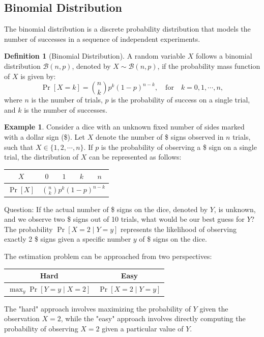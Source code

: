 \documentclass[12pt,openany]{book}
\theoremstyle{definition}
\newtheorem{definition}{Definition}[chapter]
\newtheorem{example}{Example}[chapter]
\begin{document}
	\subsection{Binomial Distribution}
	The binomial distribution is a discrete probability distribution that models the number of successes in a sequence of independent experiments.
	
	\begin{definition}[Binomial Distribution]
		A random variable $X$ follows a binomial distribution $\mathcal{B}(n, p)$, denoted by $X \sim \mathcal{B}(n, p)$, if the probability mass function of $X$ is given by:
		\[
		\Pr[X=k]=\binom{n}{k}p^k(1-p)^{n-k},\quad\text{for}\quad k=0,1,\cdots,n,
		\]
		where $n$ is the number of trials, $p$ is the probability of success on a single trial, and $k$ is the number of successes.
	\end{definition}
	
	\begin{example}
		Consider a dice with an unknown fixed number of sides marked with a dollar sign (\$). Let $X$ denote the number of \$ signs observed in $n$ trials, such that $X \in \{1, 2, \cdots, n\}$. If $p$ is the probability of observing a \$ sign on a single trial, the distribution of $X$ can be represented as follows:
		
		\begin{center}
			\begin{tabular}{c|cccc}
				$X$ & $0$ & $1$ & $k$ & $n$ \\
				\hline
				$\Pr[X]$ & \multicolumn{4}{c}{$\binom{n}{k}p^k(1-p)^{n-k}$} \\
			\end{tabular}
		\end{center}
		
		Question: If the actual number of \$ signs on the dice, denoted by $Y$, is unknown, and we observe two \$ signs out of 10 trials, what would be our best guess for $Y$? The probability $\Pr[X=2 \mid Y=y]$ represents the likelihood of observing exactly 2 \$ signs given a specific number $y$ of \$ signs on the dice.
		
		The estimation problem can be approached from two perspectives:
		
		\begin{center}
			\begin{tabular}{c|c}
				Hard & Easy \\
				\hline
				$\max_y \Pr[Y=y \mid X=2]$ & $\Pr[X=2 \mid Y=y]$ \\
			\end{tabular}
		\end{center}
		
		The "hard" approach involves maximizing the probability of $Y$ given the observation $X=2$, while the "easy" approach involves directly computing the probability of observing $X=2$ given a particular value of $Y$.
	\end{example}
\end{document}
